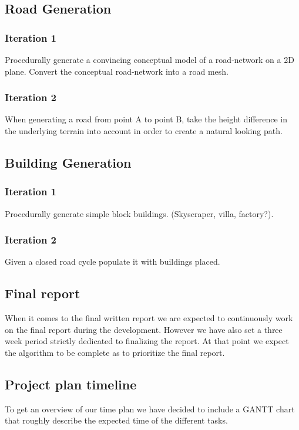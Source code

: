 \subsection{Road Generation}
\subsubsection{Iteration 1}
Procedurally generate a convincing conceptual model of a road-network on a 2D plane.
Convert the conceptual road-network into a road mesh.

\subsubsection{Iteration 2}
When generating a road from point A to point B, take the height difference in the underlying terrain into account in order to create a natural looking path.

\subsection{Building Generation}
\subsubsection{Iteration 1}
Procedurally generate simple block buildings. (Skyscraper, villa, factory?).

\subsubsection{Iteration 2}
Given a closed road cycle populate it with buildings placed.

\subsection{Final report}
When it comes to the final written report we are expected to continuously work on the final report during the development.
However we have also set a three week period strictly dedicated to finalizing the report.
At that point we expect the algorithm to be complete as to prioritize the final report.

\subsection{Project plan timeline}
To get an overview of our time plan we have decided to include a GANTT chart that roughly describe the expected time of the different tasks.



